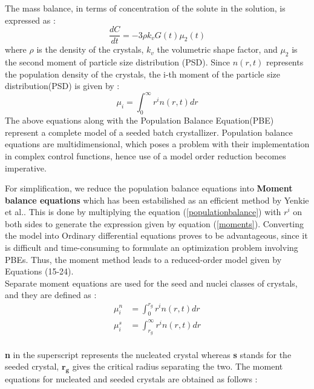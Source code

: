 \documentclass[3p,times]{elsarticle}
\begin{document}
 
The mass balance, in terms of concentration of the solute in the solution, is expressed as :
\begin{equation}
\frac{dC}{dt} = -3\rho{}k_{v}G(t)\mu_{2}(t)
\end{equation}
where $\rho{}$ is the density of the crystals, $k_{v}$ the volumetric shape factor, and $\mu_{2}$ is the second moment of particle size distribution (PSD).
Since $n(r,t)$ represents the population density of the crystals, the i-th moment of the particle size distribution(PSD) is given by :
\begin{equation} \label{moments}
\mu_{i} = \int_{0}^{\infty} r^{i}n(r,t) dr
\end{equation}
The above equations along with the Population Balance Equation(PBE) represent a complete model of a seeded batch crystallizer. 
Population balance equations are multidimensional, which poses a problem with their implementation in complex control functions, hence use of a model order reduction becomes imperative.\par
For simplification, we reduce the population balance equations into \textbf{Moment balance equations} which has been estabilished as an efficient method by Yenkie et al.\cite{yenkie}. This is done by multiplying the equation (\ref{populationbalance})  with $r^{i}$ on both sides to generate the expression given by equation (\ref{moments}). Converting the model into Ordinary differential equations proves to be advantageous, since it is difficult and time-consuming to formulate an optimization problem involving PBEs. Thus, the moment method leads to a reduced-order model given by Equations (15-24).\\ 
Separate moment equations are used for the seed and nuclei classes of crystals, and they are defined as : \\
\begin{align}
\mu^{n}_{i} &= \int_{0}^{r_{g}} r^{i}n(r,t) dr \\
\mu^{s}_{i} &= \int_{r_{g}}^{\infty} r^{i}n(r,t) dr
\end{align} \\
\textbf{n} in the superscript represents the nucleated crystal whereas \textbf{s} stands for the seeded crystal, $\boldsymbol{r_{g}}$ gives the critical radius separating the two. The moment equations for nucleated and seeded crystals are obtained as follows\cite{yenkie} :
\end{document}
